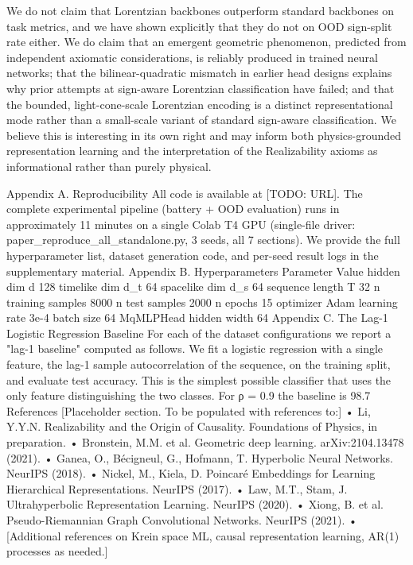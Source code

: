 We do not claim that Lorentzian backbones outperform standard backbones on task metrics, and we have shown explicitly that they do not on OOD sign-split rate either. We do claim that an emergent geometric phenomenon, predicted from independent axiomatic considerations, is reliably produced in trained neural networks; that the bilinear-quadratic mismatch in earlier head designs explains why prior attempts at sign-aware Lorentzian classification have failed; and that the bounded, light-cone-scale Lorentzian encoding is a distinct representational mode rather than a small-scale variant of standard sign-aware classification. We believe this is interesting in its own right and may inform both physics-grounded representation learning and the interpretation of the Realizability axioms as informational rather than purely physical.

Appendix A. Reproducibility
All code is available at [TODO: URL]. The complete experimental pipeline (battery + OOD evaluation) runs in approximately 11 minutes on a single Colab T4 GPU (single-file driver: paper_reproduce_all_standalone.py, 3 seeds, all 7 sections). We provide the full hyperparameter list, dataset generation code, and per-seed result logs in the supplementary material.
Appendix B. Hyperparameters
Parameter
Value
hidden dim d
128
timelike dim d_t
64
spacelike dim d_s
64
sequence length T
32
n training samples
8000
n test samples
2000
n epochs
15
optimizer
Adam
learning rate
3e-4
batch size
64
MqMLPHead hidden width
64
Appendix C. The Lag-1 Logistic Regression Baseline
For each of the dataset configurations we report a "lag-1 baseline" computed as follows. We fit a logistic regression with a single feature, the lag-1 sample autocorrelation of the sequence, on the training split, and evaluate test accuracy. This is the simplest possible classifier that uses the only feature distinguishing the two classes. For ρ = 0.9 the baseline is 98.7%
References
[Placeholder section. To be populated with references to:]
	•	Li, Y.Y.N. Realizability and the Origin of Causality. Foundations of Physics, in preparation.
	•	Bronstein, M.M. et al. Geometric deep learning. arXiv:2104.13478 (2021).
	•	Ganea, O., Bécigneul, G., Hofmann, T. Hyperbolic Neural Networks. NeurIPS (2018).
	•	Nickel, M., Kiela, D. Poincaré Embeddings for Learning Hierarchical Representations. NeurIPS (2017).
	•	Law, M.T., Stam, J. Ultrahyperbolic Representation Learning. NeurIPS (2020).
	•	Xiong, B. et al. Pseudo-Riemannian Graph Convolutional Networks. NeurIPS (2021).
	•	[Additional references on Krein space ML, causal representation learning, AR(1) processes as needed.]
